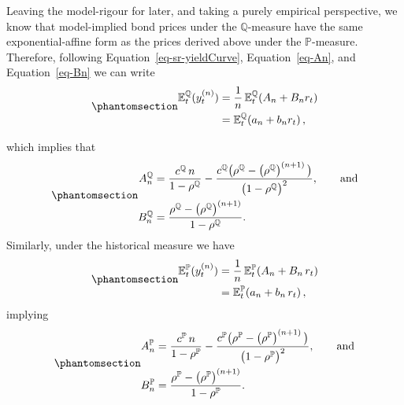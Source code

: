 \documentclass[
  letterpaper,
  DIV=11,
  numbers=noendperiod]{scrreprt}
\begin{document}
Leaving the model-rigour for later, and taking a purely empirical
perspective, we know that model-implied bond prices under the
\(\mathbb{Q}\)-measure have the same exponential-affine form as the
prices derived above under the \(\mathbb{P}\)-measure. Therefore,
following Equation~\ref{eq-sr-yieldCurve}, Equation~\ref{eq-An}, and
Equation~\ref{eq-Bn} we can write
\begin{equation}\protect\phantomsection\label{eq-sr-yieldCurve-Q}{
\begin{align}
    \mathbb{E}_t^{\mathbb{Q}}(y_t^{(n)})
    &= \frac{1}{n}\,\mathbb{E}_t^{\mathbb{Q}}\!\left(A_n + B_n r_t\right)
        \nonumber \\
    &= \mathbb{E}_t^{\mathbb{Q}}\!\left(a_n + b_n r_t\right),
\end{align}
}\end{equation}

which implies that
\begin{equation}\protect\phantomsection\label{eq-An-Bn-Q}{
\begin{align}
    A_n^{\mathbb{Q}}
    &= \frac{c^{\mathbb{Q}}\,n}{1-\rho^{\mathbb{Q}}}
        - \frac{c^{\mathbb{Q}}\big(\rho^{\mathbb{Q}}
        - \left(\rho^{\mathbb{Q}}\right)^{(n+1)}\big)}
               {\big(1-\rho^{\mathbb{Q}}\big)^2}, 
        \qquad \text{and} \\
    B_n^{\mathbb{Q}}
    &= \frac{\rho^{\mathbb{Q}}-\left(\rho^{\mathbb{Q}}\right)^{(n+1)}}
             {1-\rho^{\mathbb{Q}}}.
\end{align}
}\end{equation} Similarly, under the historical measure we have
\begin{equation}\protect\phantomsection\label{eq-sr-yieldCurve-P}{
\begin{align}
    \mathbb{E}_t^{\mathbb{P}}(y_t^{(n)})
    &= \frac{1}{n}\,\mathbb{E}_t^{\mathbb{P}}\!\left(A_n + B_n \, r_t\right)
        \nonumber \\
    &= \mathbb{E}_t^{\mathbb{P}}\!\left(a_n + b_n\, r_t\right),
\end{align}
}\end{equation} implying
\begin{equation}\protect\phantomsection\label{eq-An-Bn-P}{
\begin{align}
    A_n^{\mathbb{P}}
    &= \frac{c^{\mathbb{P}}\,n}{1-\rho^{\mathbb{P}}}
        - \frac{c^{\mathbb{P}}\big(\rho^{\mathbb{P}}
        - \left(\rho^{\mathbb{P}}\right)^{(n+1)}\big)}
               {\big(1-\rho^{\mathbb{P}}\big)^2}, 
        \qquad \text{and} \\
    B_n^{\mathbb{P}}
    &= \frac{\rho^{\mathbb{P}}-\left(\rho^{\mathbb{P}}\right)^{(n+1)}}
             {1-\rho^{\mathbb{P}}}.
\end{align}
}\end{equation}
\end{document}
